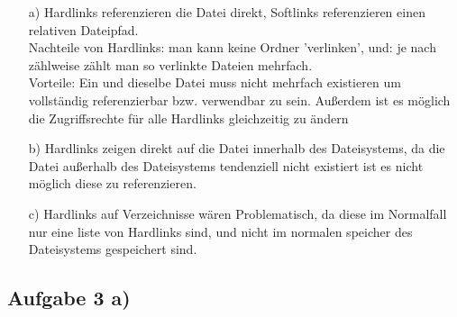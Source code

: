 \documentclass{scrartcl}
\begin{document}
\begin{itemize}
  \item[a)] Hardlinks referenzieren die Datei direkt, Softlinks referenzieren einen relativen Dateipfad. \\
    Nachteile von Hardlinks: man kann keine Ordner 'verlinken', und: je nach zählweise zählt man
    so verlinkte Dateien mehrfach. \\
    Vorteile: Ein und dieselbe Datei muss nicht mehrfach existieren um vollständig referenzierbar
    bzw. verwendbar zu sein. Außerdem ist es möglich die Zugriffsrechte für alle Hardlinks
    gleichzeitig zu ändern

  \item[b)] Hardlinks zeigen direkt auf die Datei innerhalb des Dateisystems, da die Datei
  außerhalb des Dateisystems tendenziell nicht existiert ist es nicht möglich diese zu
  referenzieren.

  \item[c)] Hardlinks auf Verzeichnisse wären Problematisch, da diese im Normalfall nur eine liste
  von Hardlinks sind, und nicht im normalen speicher des Dateisystems gespeichert sind.


\end{itemize}


\subsection*{Aufgabe 3 a)}
\end{document}

